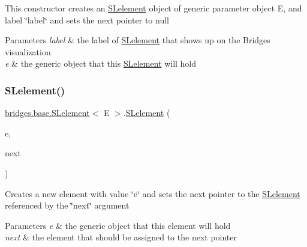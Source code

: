 This constructor creates an \mbox{\hyperlink{classbridges_1_1base_1_1_s_lelement}{S\+Lelement}} object of generic parameter object E, and label \char`\"{}label\char`\"{} and sets the next pointer to null


\begin{DoxyParams}{Parameters}
{\em label} & the label of \mbox{\hyperlink{classbridges_1_1base_1_1_s_lelement}{S\+Lelement}} that shows up on the Bridges visualization \\
\hline
{\em e} & the generic object that this \mbox{\hyperlink{classbridges_1_1base_1_1_s_lelement}{S\+Lelement}} will hold \\
\hline
\end{DoxyParams}
\mbox{\label{classbridges_1_1base_1_1_s_lelement_abc5e333fd2f3289eede108175908f97d}} 
\subsubsection{\texorpdfstring{SLelement()}{SLelement()}\hspace{0.1cm}{\footnotesize\ttfamily [3/5]}}
{\footnotesize\ttfamily \mbox{\hyperlink{classbridges_1_1base_1_1_s_lelement}{bridges.\+base.\+S\+Lelement}}$<$ E $>$.\mbox{\hyperlink{classbridges_1_1base_1_1_s_lelement}{S\+Lelement}} (\begin{DoxyParamCaption}\item[{E}]{e,  }\item[{\mbox{\hyperlink{classbridges_1_1base_1_1_s_lelement}{S\+Lelement}}$<$ E $>$}]{next }\end{DoxyParamCaption})}

Creates a new element with value \char`\"{}e\char`\"{} and sets the next pointer to the \mbox{\hyperlink{classbridges_1_1base_1_1_s_lelement}{S\+Lelement}} referenced by the \char`\"{}next\char`\"{} argument


\begin{DoxyParams}{Parameters}
{\em e} & the generic object that this element will hold \\
\hline
{\em next} & the element that should be assigned to the next pointer \\
\hline
\end{DoxyParams}
\mbox{\label{classbridges_1_1base_1_1_s_lelement_aa40c4c7bda4d7a852edb21a8ed537cae}} 
